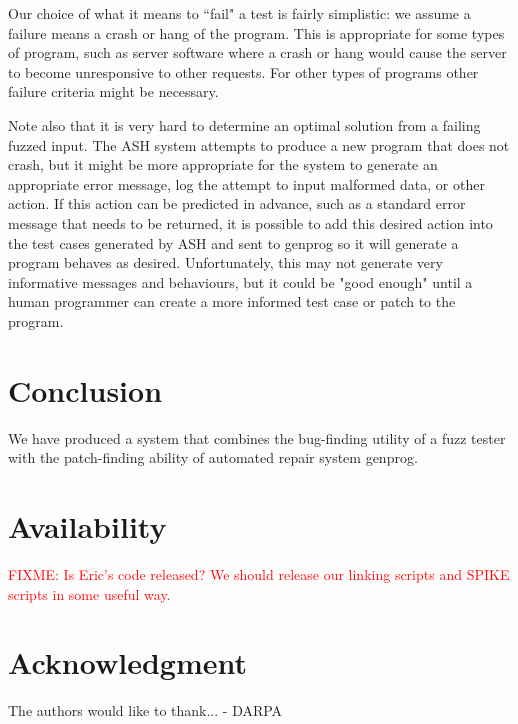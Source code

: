 \documentclass[conference]{IEEEtran}
\newcommand{\FIXME}[1]{\textcolor{red}{FIXME: #1}}
\begin{document}
Our choice of what it means to ``fail" a test is fairly simplistic: we assume a
failure means a crash or hang of the program.  This is appropriate for some
types of program, such as server software where a crash or hang would cause the
server to become unresponsive to other requests.   For other types of programs
other failure criteria might be necessary. 

Note also that it is very hard to determine an optimal solution from a failing
fuzzed input.  The ASH system attempts to produce a new program that does not
crash, but it might be more appropriate for the system to generate an
appropriate error message, log the attempt to input malformed data, or other
action.  If this action can be predicted in advance, such as a standard error
message that needs to be returned, it is possible to add this desired action
into the test cases generated by ASH and sent to genprog so it will generate a
program behaves as desired.   Unfortunately, this may not generate very
informative messages and behaviours, but it could be "good enough" until a human
programmer can create a more informed test case or patch to the program.



\section{Conclusion}
We have produced a system that combines the bug-finding utility of a fuzz tester
with the patch-finding ability of automated repair system genprog.


\section{Availability}
\FIXME{Is Eric's code released?  We should release our linking scripts and
SPIKE scripts in some useful way.}

\section*{Acknowledgment}

The authors would like to thank...
- DARPA



\end{document}
